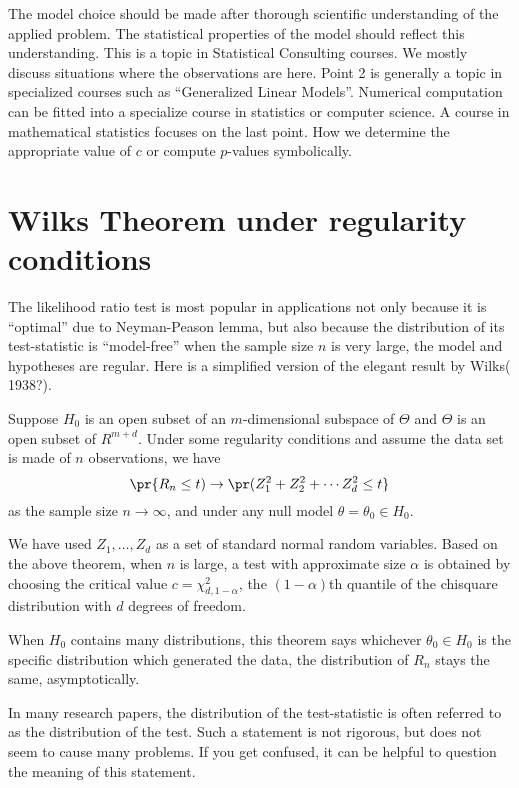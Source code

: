The model choice should be made after thorough
scientific understanding of the applied problem.
The statistical properties of the model should reflect this understanding. 
This is a topic in Statistical Consulting courses. 
We mostly discuss situations where the observations are \iid here. 
Point 2 is generally a topic in specialized courses such as ``Generalized Linear Models''.
Numerical computation can be fitted into a specialize course in statistics or computer science.
A course in mathematical statistics focuses on the last point. 
How we determine the appropriate value of $c$ or compute $p$-values symbolically.

\section{Wilks Theorem under regularity conditions}

The likelihood ratio test is most popular in applications
not only because it is ``optimal'' due to Neyman-Peason lemma, 
but also because the distribution of its test-statistic 
is ``model-free'' when the sample size $n$ is very large, 
the model and hypotheses are regular.
Here is a simplified version of the elegant result by Wilks( 1938?).

\begin{theorem}
\label{thm16.1}
Suppose $H_0$ is an open subset of an $m$-dimensional
subspace of $\Theta$ and $\Theta$ is an open subset of $R^{m+d}$.
Under some regularity conditions and assume the
data set is made of $n$ \iid observations, we have
\[
\pr\{ R_n \leq t) \to \pr( Z_1^2 + Z_2^2 + \cdots Z_d^2 \leq t \}
\]
as the sample size $n \to \infty$, and under any null model 
$\theta = \theta_0 \in H_0$.
\end{theorem}

We have used $Z_1, \ldots, Z_d$ as a set of \iid standard normal
random variables. Based on the above theorem, when $n$ is large, 
a test with approximate size $\alpha$ is obtained
by choosing the critical value $c = \chi^2_{d, 1- \alpha}$, 
the $(1-\alpha)$th quantile of
the chisquare distribution with $d$ degrees of freedom.

When $H_0$ contains many distributions, this theorem
says whichever $\theta_0 \in H_0$ is the specific distribution
which generated the data, the distribution of $R_n$ stays the
same, asymptotically.

In many research papers, the distribution of the test-statistic
is often referred to as the distribution of the test.
Such a statement is not rigorous, but does not seem to cause
many problems. If you get confused, it can be helpful to question
the meaning of this statement.

